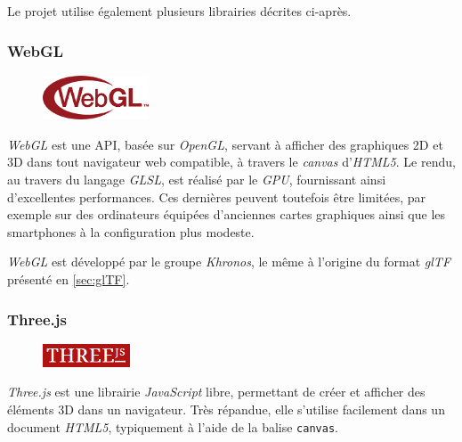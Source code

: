 Le projet utilise également plusieurs librairies décrites ci-après.

\subsubsection{WebGL}

\begin{figure}
  \begin{center}
    \includegraphics[width=0.28\textwidth]{Figures/webgl-logo.png}
  \end{center}
\end{figure}
\textit{WebGL} est une API, basée sur \textit{OpenGL}, servant à afficher des graphiques 2D et 3D dans tout navigateur web compatible\cite{webgl-compatibility}, à travers le \textit{canvas} d'\textit{HTML5}. 
Le rendu, au travers du langage \textit{GLSL}, est réalisé par le \textit{GPU}, fournissant ainsi d'excellentes performances. Ces dernières peuvent toutefois être limitées, par exemple sur des ordinateurs équipées d'anciennes cartes graphiques ainsi que les smartphones à la configuration plus modeste.

\textit{WebGL} est développé par le groupe \textit{Khronos}, le même à l'origine du format \textit{glTF} présenté en \ref{sec:glTF}.

\subsubsection{Three.js}

\begin{figure}
  \begin{center}
    \includegraphics[width=0.23\textwidth]{Figures/threejs-logo.png}
  \end{center}
\end{figure}

\textit{Three.js} est une librairie \textit{JavaScript} libre, permettant de créer et afficher des éléments 3D dans un navigateur. Très répandue, elle s'utilise facilement dans un document \textit{HTML5}, typiquement à l'aide de la balise \texttt{canvas}.


